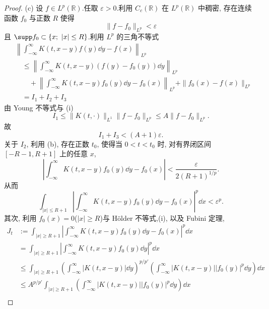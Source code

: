 \begin{proof}
(c) 设 $f \in L^{p}(\mathbb{R})$.任取 $\varepsilon > 0$.利用 $C_{c}(\mathbb{R})$ 在 $L^{p}(\mathbb{R})$ 中稠密, 存在连续函数 $f_{0}$ 与正数 $R$ 使得
\begin{equation*}
\| f - f_{0} \|_{L^{p}} < \varepsilon
\end{equation*}
且 $\supp f_{0} \subset \{x;\ |x| \leq R\}$.利用 $L^{p}$ 的三角不等式
\begin{align*}
& \left\| \int_{-\infty}^{\infty} K(t, x - y)f(y)\dd y - f(x) \right\|_{L^{p}} \\
& \quad \leq \left\| \int_{-\infty}^{\infty} K(t, x - y)(f(y) - f_{0}(y))\dd y \right\|_{L^{p}} \\
& \quad\quad + \left\| \int_{-\infty}^{\infty} K(t, x - y)f_{0}(y)\dd y - f_{0}(x) \right\|_{L^{p}} + \| f_{0}(x) - f(x) \|_{L^{p}} \\
& \quad = I_{1} + I_{2} + I_{3}
\end{align*}
由 Young 不等式与 (i)
\begin{equation*}
I_{1} \leq \| K(t, \cdot) \|_{L^{1}} \| f - f_{0} \|_{L^{p}} \leq A\| f - f_{0} \|_{L^{p}}.
\end{equation*}
故
\begin{equation*}
I_{1} + I_{3} < (A + 1)\varepsilon.
\end{equation*}
关于 $I_{2}$, 利用 (b), 存在正数 $t_{0}$, 使得当 $0 < t < t_{0}$ 时, 对有界闭区间 $[-R-1, R+1]$ 上的任意 $x$, 
\begin{equation*}
\left| \int_{-\infty}^{\infty} K(t, x - y)f_{0}(y)\dd y - f_{0}(x) \right| < \frac{\varepsilon}{2(R+1)^{1/p}}.
\end{equation*}
从而
\begin{equation*}
\int_{|x| \leq R + 1}\left| \int_{-\infty}^{\infty} K(t, x - y)f_{0}(y)\dd y - f_{0}(x) \right|^{p}\dd x < \varepsilon^{p}.
\end{equation*}
其次, 利用 $f_{0}(x) = 0$($|x| \geq R$)与 Hölder 不等式,(i), 以及 Fubini 定理, 
\begin{align*}
J_{t} &:= \int_{|x| \geq R + 1}\left| \int_{-\infty}^{\infty} K(t, x - y)f_{0}(y)\dd y - f_{0}(x) \right|^{p}\dd x \\
&= \int_{|x| \geq R + 1}\left| \int_{-\infty}^{\infty} K(t, x - y)f_{0}(y)\dd y \right|^{p}\dd x \\
&\leq \int_{|x| \geq R + 1}\left(\int_{-\infty}^{\infty} |K(t, x - y)|\dd y\right)^{p/p'}\left(\int_{-\infty}^{\infty} |K(t, x - y)||f_{0}(y)|^{p}\dd y\right)\dd x \\
&\leq A^{p/p'}\int_{|x| \geq R + 1}\left(\int_{-\infty}^{\infty} |K(t, x - y)||f_{0}(y)|^{p}\dd y\right)\dd x \\

\end{align*}
\end{proof}
